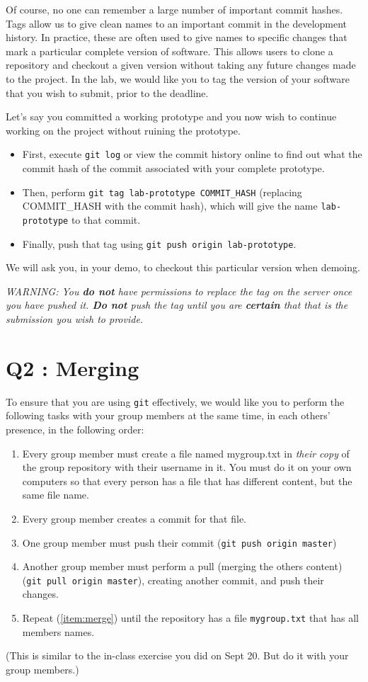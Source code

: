 \documentclass{article}
\begin{document}
Of course, no one can remember a large number of important commit hashes. Tags allow us to give clean names to an important commit in the development history. In practice, these are often used to give names to specific changes that mark a particular complete version of software. This allows users to clone a repository and checkout a given version without taking any future changes made to the project. In the lab, we would like you to tag the version of your software that you wish to submit, prior to the deadline.

Let's say you committed a working prototype and you now wish to continue working on the project without ruining the prototype.
\begin{itemize}
\item First, execute \texttt{git log} or view the commit history online to find out what the commit hash of the commit associated with your complete prototype.
\item Then, perform \texttt{git tag lab-prototype COMMIT\_HASH} (replacing COMMIT\_HASH with the commit hash), which will give the name \texttt{lab-prototype} to that commit.
\item Finally, push that tag using \texttt{git push origin lab-prototype}.
\end{itemize}

We will ask you, in your demo, to checkout this particular version when demoing.

\emph{WARNING: You \textbf{do not} have permissions to replace the tag on the server once you have pushed it. \textbf{Do not} push the tag until you are \textbf{certain} that that is the submission you wish to provide.}

\section*{Q2 : Merging}
To ensure that you are using \texttt{git} effectively, we would like you to perform the following tasks with your group members at the same time, in each others' presence, in the following order:
\begin{enumerate}
    \item Every group member must create a file named mygroup.txt in \emph{their copy} of the group repository with their username in it. You must do it on your own computers so that every person has a file that has different content, but the same file name.
    \item Every group member creates a commit for that file.
    \item One group member must push their commit (\texttt{git push origin master})
    \item Another group member must perform a pull (merging the others content) (\texttt{git pull origin master}), creating another commit, and push their changes.\label{item:merge}
    \item Repeat (\ref{item:merge}) until the repository has a file \texttt{mygroup.txt} that has all members names.
\end{enumerate}
(This is similar to the in-class exercise you did on Sept 20. But do it with your group members.)
\end{document}

